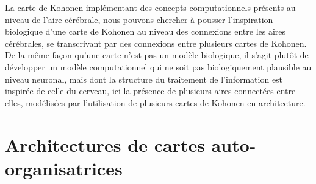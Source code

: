 \documentclass[../main]{subfiles}
\begin{document}


La carte de Kohonen implémentant des concepts computationnels présents au niveau de l'aire cérébrale, nous pouvons chercher à pousser l'inspiration biologique d'une carte de Kohonen au niveau des connexions entre les aires cérébrales, se transcrivant par des connexions entre plusieurs cartes de Kohonen.
De la même façon qu'une carte n'est pas un modèle biologique, il s'agit plutôt de développer un modèle computationnel qui ne soit pas biologiquement plausible au niveau neuronal, mais dont la structure du traitement de l'information est inspirée de celle du cerveau, ici la présence de plusieurs aires connectées entre elles, modélisées par l'utilisation de plusieurs cartes de Kohonen en architecture.

\section{Architectures de cartes auto-organisatrices}
\end{document}
